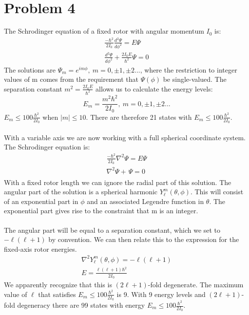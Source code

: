 \documentclass[a4paper,10pt]{article}
\numberwithin{equation}{section}
\begin{document}
\section{Problem 4}
The Schrodinger equation of a fixed rotor with angular momentum $I_0$ is:
\begin{gather}
 \frac{-\hbar ^2}{2I_0}\frac{d^2 \Psi}{d\phi ^2}=E\Psi\\
 \frac{d^2 \Psi}{d\phi ^2}+\frac{2I_0E}{\hbar ^2}\Psi=0
\end{gather}
The solutions are $\Psi_m=e^{i m \phi},\ m=0,\pm 1, \pm2...$, where the restriction to integer values of m comes from the requirement that $\Psi(\phi)$ be single-valued.
The separation constant $m^2=\frac{2I_0E}{\hbar ^2}$ allows us to calculate the energy levels:
\begin{equation}
 E_m=\frac{m^2 \hbar^2}{2I_0},\ m=0,\pm 1, \pm 2...
\end{equation}
$E_m \leq 100\frac{\hbar ^2}{2I_0}$ when $|m|\leq10$. There are therefore 21 states with $E_m \leq 100\frac{\hbar ^2}{2I_0}$.
\\ \\
With a variable axis we are now working with a full spherical coordinate system. The Schrodinger equation is:
\begin{gather}
 \frac{-\hbar^2}{2I_0}\nabla^2\Psi=E\Psi\\
 \nabla^2\Psi+\frac{}{}\Psi=0
\end{gather}
With a fixed rotor length we can ignore the radial part of this solution. 
The angular part of the solution is a spherical harmonic $Y_\ell^m(\theta, \phi)$.
This will consist of an exponential part in $\phi$ and an associated Legendre function in $\theta$.
The exponential part gives rise to the constraint that m is an integer.\\ \\
The angular part will be equal to a separation constant, which we set to $-\ell(\ell+1)$ by convention. 
We can then relate this to the expression for the fixed-axis rotor energies.
\begin{gather}
 \nabla^2Y_\ell^m(\theta, \phi)=-\ell(\ell+1)\\
 E=\frac{\ell(\ell+1)\hbar^2}{2I_0}
\end{gather}
We apparently recognize that this is $(2\ell+1)$-fold degenerate. 
The maximum value of $\ell$ that satisfies $E_m \leq 100\frac{\hbar ^2}{2I_0}$ is 9.
With 9 energy levels and $(2\ell+1)$-fold degeneracy there are 99 states with energy $E_m \leq 100\frac{\hbar ^2}{2I_0}$.
\end{document}
